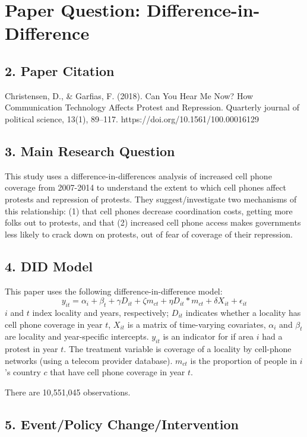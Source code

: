 \documentclass{article}
\begin{document}
\section{Paper Question: Difference-in-Difference}

\subsection*{2. Paper Citation}

Christensen, D., \& Garfias, F. (2018). Can You Hear Me Now? How Communication Technology Affects Protest and Repression. Quarterly journal of political science, 13(1), 89–117. https://doi.org/10.1561/100.00016129

\subsection*{3. Main Research Question}

This study uses a difference-in-differences analysis of increased cell phone coverage from 2007-2014 to understand the extent to which cell phones affect protests and repression of protests. They suggest/investigate two mechanisms of this relationship: (1) that cell phones decrease coordination costs, getting more folks out to protests, and that (2) increased cell phone access makes governments less likely to crack down on protests, out of fear of coverage of their repression. 

\subsection*{4. DID Model}

This paper uses the following difference-in-difference model: 
$$y_{it} = \alpha_i + \beta_t + \gamma D_{it} + \zeta m_{ct} + \eta D_{it} * m_{ct}+ \delta X_{it} + \epsilon_{it}$$
$i$ and $t$ index locality and years, respectively; $D_{it}$ indicates whether a locality has cell phone coverage in year $t$, $X_{it}$ is a matrix of time-varying covariates, $\alpha_{i}$ and $\beta_{t}$ are locality and year-specific intercepts.
$y_{it}$ is an indicator for if area $i$ had a protest in year $t$. The treatment variable is coverage of a locality by cell-phone networks (using a telecom provider database).
$m_{ct}$ is the proportion of people in $i$'s country $c$ that have cell phone coverage in year $t$.

There are 10,551,045 observations.

\subsection*{5. Event/Policy Change/Intervention}
\end{document}
